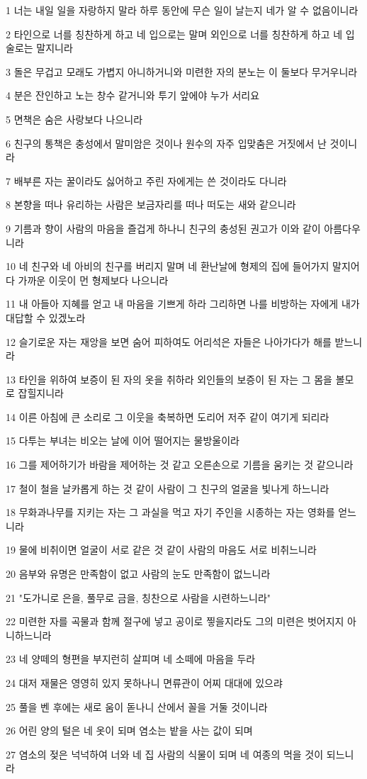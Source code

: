 \par 1 너는 내일 일을 자랑하지 말라 하루 동안에 무슨 일이 날는지 네가 알 수 없음이니라
\par 2 타인으로 너를 칭찬하게 하고 네 입으로는 말며 외인으로 너를 칭찬하게 하고 네 입술로는 말지니라
\par 3 돌은 무겁고 모래도 가볍지 아니하거니와 미련한 자의 분노는 이 둘보다 무거우니라
\par 4 분은 잔인하고 노는 창수 같거니와 투기 앞에야 누가 서리요
\par 5 면책은 숨은 사랑보다 나으니라
\par 6 친구의 통책은 충성에서 말미암은 것이나 원수의 자주 입맞춤은 거짓에서 난 것이니라
\par 7 배부른 자는 꿀이라도 싫어하고 주린 자에게는 쓴 것이라도 다니라
\par 8 본향을 떠나 유리하는 사람은 보금자리를 떠나 떠도는 새와 같으니라
\par 9 기름과 향이 사람의 마음을 즐겁게 하나니 친구의 충성된 권고가 이와 같이 아름다우니라
\par 10 네 친구와 네 아비의 친구를 버리지 말며 네 환난날에 형제의 집에 들어가지 말지어다 가까운 이웃이 먼 형제보다 나으니라
\par 11 내 아들아 지혜를 얻고 내 마음을 기쁘게 하라 그리하면 나를 비방하는 자에게 내가 대답할 수 있겠노라
\par 12 슬기로운 자는 재앙을 보면 숨어 피하여도 어리석은 자들은 나아가다가 해를 받느니라
\par 13 타인을 위하여 보증이 된 자의 옷을 취하라 외인들의 보증이 된 자는 그 몸을 볼모로 잡힐지니라
\par 14 이른 아침에 큰 소리로 그 이웃을 축복하면 도리어 저주 같이 여기게 되리라
\par 15 다투는 부녀는 비오는 날에 이어 떨어지는 물방울이라
\par 16 그를 제어하기가 바람을 제어하는 것 같고 오른손으로 기름을 움키는 것 같으니라
\par 17 철이 철을 날카롭게 하는 것 같이 사람이 그 친구의 얼굴을 빛나게 하느니라
\par 18 무화과나무를 지키는 자는 그 과실을 먹고 자기 주인을 시종하는 자는 영화를 얻느니라
\par 19 물에 비취이면 얼굴이 서로 같은 것 같이 사람의 마음도 서로 비취느니라
\par 20 음부와 유명은 만족함이 없고 사람의 눈도 만족함이 없느니라
\par 21 "도가니로 은을, 풀무로 금을, 칭찬으로 사람을 시련하느니라"
\par 22 미련한 자를 곡물과 함께 절구에 넣고 공이로 찧을지라도 그의 미련은 벗어지지 아니하느니라
\par 23 네 양떼의 형편을 부지런히 살피며 네 소떼에 마음을 두라
\par 24 대저 재물은 영영히 있지 못하나니 면류관이 어찌 대대에 있으랴
\par 25 풀을 벤 후에는 새로 움이 돋나니 산에서 꼴을 거둘 것이니라
\par 26 어린 양의 털은 네 옷이 되며 염소는 밭을 사는 값이 되며
\par 27 염소의 젖은 넉넉하여 너와 네 집 사람의 식물이 되며 네 여종의 먹을 것이 되느니라

